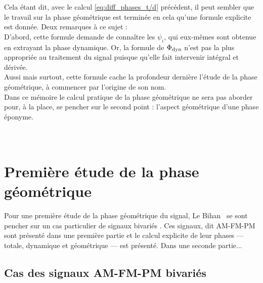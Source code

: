 Cela étant dit, avec le calcul \eqref{eq:diff_phases_t/d} précédent, il peut sembler que le travail sur la phase géométrique est terminée en cela qu'une formule explicite est donnée. Deux remarques à ce sujet :
\\
D'abord, cette formule demande de connaître les $\psi_i$, qui eux-mêmes sont obtenue en extrayant la phase dynamique. Or, la formule de $\Phi_{\text{\normalfont dyn}}$ n'est pas  la plus appropriée au traitement du signal puisque qu'elle fait intervenir intégral et dérivée.
\\
Aussi mais surtout, cette formule cache la profondeur dernière l'étude de la phase géométrique, à commencer par l'origine de son nom.
\\
Dans ce mémoire le calcul pratique de la phase géométrique ne sera pas aborder pour, à la place, se pencher sur le second point : l'aspect géométrique d'une phase éponyme.
\\ \\

\\



\section{Première étude de la phase géométrique} \label{sec:AM-FM-PM}

Pour une première étude de la phase géométrique du signal, Le Bihan \etal~se sont pencher sur un cas particulier de signaux bivariés \cite{flamant_timefrequency_2019,le_bihan_modephysiques_2023, le_bihan_geometric_2024}. Ces signaux, dit AM-FM-PM sont présenté dans une première partie et le calcul explicite de leur phases --- totale, dynamique et géométrique --- est présenté. Dans une seconde partie... 
\\



\subsection{Cas des signaux AM-FM-PM bivariés} \label{subsec:AM-FM-PM}

